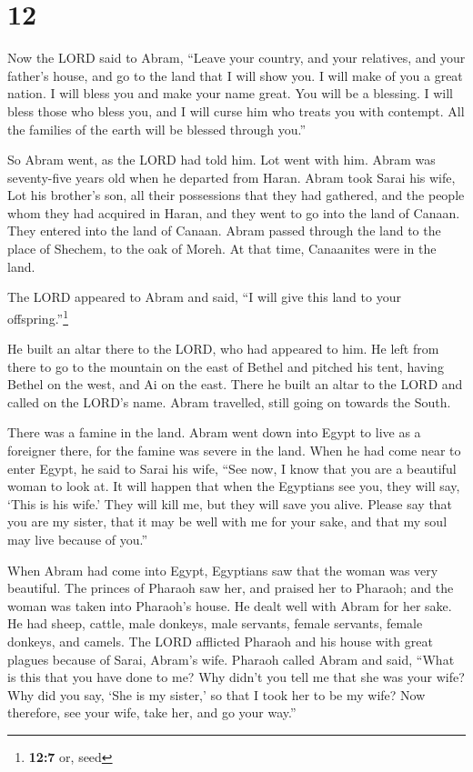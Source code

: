 \hypertarget{section-11}{%
\section{12}\label{section-11}}

 Now the LORD said to Abram, ``Leave your country, and
your relatives, and your father's house, and go to the land that I will
show you.  I will make of you a great nation. I will bless
you and make your name great. You will be a blessing.  I
will bless those who bless you, and I will curse him who treats you with
contempt. All the families of the earth will be blessed through you.''

 So Abram went, as the LORD had told him. Lot went with
him. Abram was seventy-five years old when he departed from Haran.
 Abram took Sarai his wife, Lot his brother's son, all
their possessions that they had gathered, and the people whom they had
acquired in Haran, and they went to go into the land of Canaan. They
entered into the land of Canaan.  Abram passed through the
land to the place of Shechem, to the oak of Moreh. At that time,
Canaanites were in the land.

 The LORD appeared to Abram and said, ``I will give this
land to your offspring.''\footnote{\textbf{12:7} or, seed}

He built an altar there to the LORD, who had appeared to him.
 He left from there to go to the mountain on the east of
Bethel and pitched his tent, having Bethel on the west, and Ai on the
east. There he built an altar to the LORD and called on the LORD's name.
 Abram travelled, still going on towards the South.

 There was a famine in the land. Abram went down into
Egypt to live as a foreigner there, for the famine was severe in the
land.  When he had come near to enter Egypt, he said to
Sarai his wife, ``See now, I know that you are a beautiful woman to look
at.  It will happen that when the Egyptians see you, they
will say, `This is his wife.' They will kill me, but they will save you
alive.  Please say that you are my sister, that it may be
well with me for your sake, and that my soul may live because of you.''

 When Abram had come into Egypt, Egyptians saw that the
woman was very beautiful.  The princes of Pharaoh saw
her, and praised her to Pharaoh; and the woman was taken into Pharaoh's
house.  He dealt well with Abram for her sake. He had
sheep, cattle, male donkeys, male servants, female servants, female
donkeys, and camels.  The LORD afflicted Pharaoh and his
house with great plagues because of Sarai, Abram's wife. 
Pharaoh called Abram and said, ``What is this that you have done to me?
Why didn't you tell me that she was your wife?  Why did
you say, `She is my sister,' so that I took her to be my wife? Now
therefore, see your wife, take her, and go your way.''

